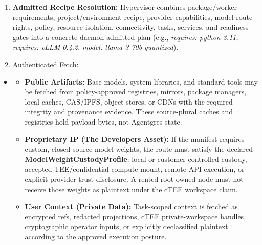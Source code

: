 \documentclass[
  11pt,
]{article}
\providecommand{\tightlist}{%
  \setlength{\itemsep}{0pt}\setlength{\parskip}{0pt}}
\begin{document}
\begin{enumerate}
\def\labelenumi{\arabic{enumi}.}
\tightlist
\item
  \textbf{Admitted Recipe Resolution:} Hypervisor combines package/worker
  requirements, project/environment recipe, provider capabilities, model-route
  rights, policy, resource isolation, connectivity, tasks, services, and
  readiness gates into a concrete daemon-admitted plan (e.g.,
  \emph{requires: python-3.11},
  \emph{requires: vLLM-0.4.2}, \emph{model: llama-3-70b-quantized}).
\item
  Authenticated Fetch:
\end{enumerate}

\begin{itemize}
\item
  \begin{itemize}
  \tightlist
  \item
    \textbf{Public Artifacts:} Base models, system libraries, and standard
    tools may be fetched from policy-approved registries, mirrors, package
    managers, local caches, CAS/IPFS, object stores, or CDNs with the required
    integrity and provenance evidence. These source-plural caches and registries
    hold payload bytes, not Agentgres state.
  \item
    \textbf{Proprietary IP (The Developer\textquotesingle s Asset):} If
    the manifest requires custom, closed-source model weights, the route
    must satisfy the declared \textbf{ModelWeightCustodyProfile}: local or
    customer-controlled custody, accepted TEE/confidential-compute mount,
    remote-API execution, or explicit provider-trust disclosure. A rented
    root-owned node must not receive those weights as plaintext under the
    cTEE workspace claim.
  \item
    \textbf{User Context (Private Data):} Task-scoped context is fetched
    as encrypted refs, redacted projections, cTEE private-workspace
    handles, cryptographic operator inputs, or explicitly declassified
    plaintext according to the approved execution posture.
  \end{itemize}
\end{itemize}
\end{document}
